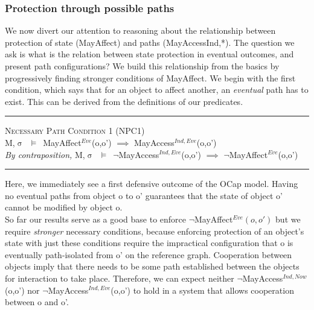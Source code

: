 \documentclass[a4paper,11pt, twoside,twocolumn]{article}
\newenvironment{logic}[1][null]
{\begin{flushleft} \small \label{#1}}
{\end{flushleft}}
\newcommand{\loimplies}{$\implies$}
\newcommand{\losigma}{$\upsigma$}
\newcommand{\loturns} {$\vDash$}
\newcommand{\loneg}{$\boldsymbol \neg$}
\newcommand{\ablock} {\null\qquad}
\begin{document}
\subsubsection{Protection through possible paths}
We now divert our attention to reasoning about the relationship between protection of state (MayAffect) and paths (MayAccess{Ind,*}). The question we ask is what is the relation between state protection in eventual outcomes, and present path configurations? We build this relationship from the basics by progressively finding stronger conditions of MayAffect. We begin with the first condition, which says that for an object to affect another, an \textit{eventual} path has to exist. This can be derived from the definitions of our predicates.
\begin{logic}[Implication 1]
\hrule\null
\textsc{\normalsize *Necessary Path Condition 1 (NPC1)}\\
M,\losigma\ \loturns\ MayAffect$^{Eve}$(o,o') \loimplies\linebreak
	\ablock MayAccess$^{Ind,Eve}$(o,o')
\linebreak \\
\textit{By contraposition,}\linebreak
M,\losigma\ \loturns\ \loneg MayAccess$^{Ind,Eve}$(o,o') \loimplies\linebreak
	\ablock \loneg MayAffect$^{Eve}$(o,o')
\linebreak
\hrule
\end{logic}
Here, we immediately see a first defensive outcome of the OCap model. Having no eventual paths from object o to o' guarantees that the state of object o' cannot be modified by object o.\\

So far our results serve as a good base to enforce \loneg MayAffect$^{Eve}(o,o')$ but we require \textit{stronger} necessary conditions, because enforcing protection of an object's state with just these conditions require the impractical configuration that o is eventually path-isolated from o' on the reference graph. Cooperation between objects imply that there needs to be some path established between the objects for interaction to take place. Therefore, we can expect neither \loneg MayAccess$^{Ind,Now}$(o,o') nor \loneg MayAccess$^{Ind,Eve}$(o,o') to hold in a system that allows cooperation between o and o'.\\
\end{document}
